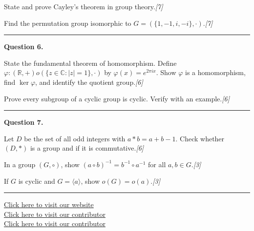 \documentclass[11pt,a4paper]{article}
\newcommand{\pts}[1]{\hfill   \textit{[#1]}}
\begin{document}
\begin{parts}
  \item State and prove Cayley's theorem in group theory.\pts{7}
  \item Find the permutation group isomorphic to $G=(\{1,-1,i,-i\},\cdot)$.\pts{7}
\end{parts}
\medskip\rule{\linewidth}{0.2pt}

\medskip


\noindent   \textbf{Question 6.}

\begin{parts}
  \item State the fundamental theorem of homomorphism. Define $\varphi:(\mathbb{R},+) o(\{z\in\mathbb{C}:|z|=1\},\cdot)$ by $\varphi(x)=e^{2\pi ix}$. Show $\varphi$ is a homomorphism, find $\ker\varphi$, and identify the quotient group.\pts{6}
  \item Prove every subgroup of a cyclic group is cyclic. Verify with an example.\pts{6}
\end{parts}
\medskip\rule{\linewidth}{0.2pt}

\medskip


\noindent   \textbf{Question 7.}

\begin{parts}
  \item Let $D$ be the set of all odd integers with $a*b=a+b-1$. Check whether $(D,*)$ is a group and if it is commutative.\pts{6}
  \item In a group $(G,\circ)$, show $(a\circ b)^{-1}=b^{-1}\circ a^{-1}$ for all $a,b\in G$.\pts{3}
  \item If $G$ is cyclic and $G=\langle a\rangle$, show $o(G)=o(a)$.\pts{3}
\end{parts}

\vfill\rule{\linewidth}{0.4pt}

\begin{center}\small
\href{https://bhu-exam.vercel.app/}{Click here to visit our website}\\[4pt]
\href{https://me-aryan.vercel.app/}{Click here to visit our contributor}\\[4pt]
\href{https://quashan-me.vercel.app/}{Click here to visit our contributor}
\end{center}
\end{document}
